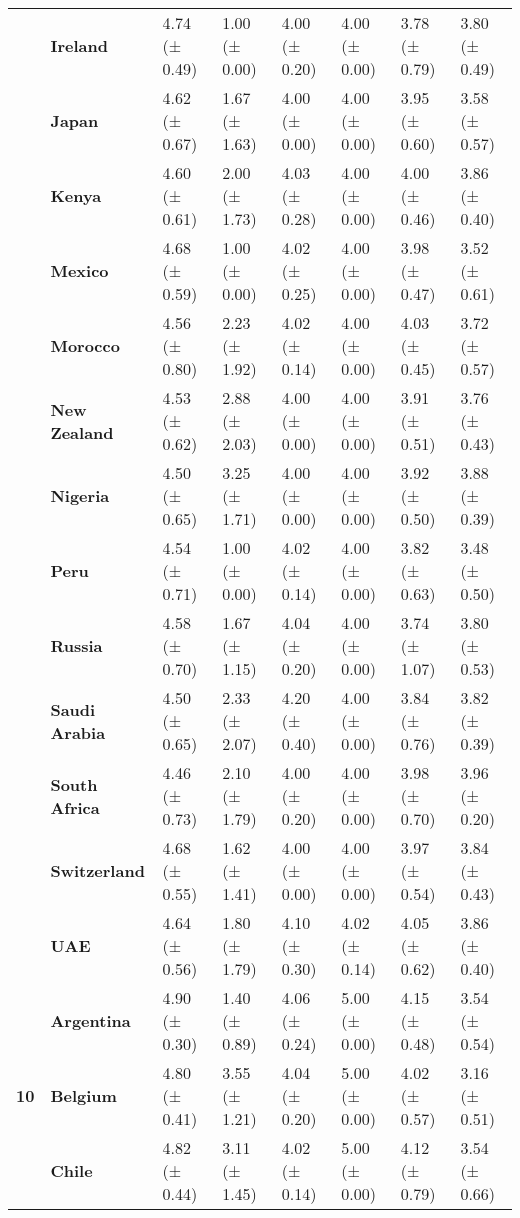 \begin{tabular}{llllllll}
\textbf{} & \textbf{Ireland} & 4.74 (± 0.49) & 1.00 (± 0.00) & 4.00 (± 0.20) & 4.00 (± 0.00) & 3.78 (± 0.79) & 3.80 (± 0.49) \\
\textbf{} & \textbf{Japan} & 4.62 (± 0.67) & 1.67 (± 1.63) & 4.00 (± 0.00) & 4.00 (± 0.00) & 3.95 (± 0.60) & 3.58 (± 0.57) \\
\textbf{} & \textbf{Kenya} & 4.60 (± 0.61) & 2.00 (± 1.73) & 4.03 (± 0.28) & 4.00 (± 0.00) & 4.00 (± 0.46) & 3.86 (± 0.40) \\
\textbf{} & \textbf{Mexico} & 4.68 (± 0.59) & 1.00 (± 0.00) & 4.02 (± 0.25) & 4.00 (± 0.00) & 3.98 (± 0.47) & 3.52 (± 0.61) \\
\textbf{} & \textbf{Morocco} & 4.56 (± 0.80) & 2.23 (± 1.92) & 4.02 (± 0.14) & 4.00 (± 0.00) & 4.03 (± 0.45) & 3.72 (± 0.57) \\
\textbf{} & \textbf{New Zealand} & 4.53 (± 0.62) & 2.88 (± 2.03) & 4.00 (± 0.00) & 4.00 (± 0.00) & 3.91 (± 0.51) & 3.76 (± 0.43) \\
\textbf{} & \textbf{Nigeria} & 4.50 (± 0.65) & 3.25 (± 1.71) & 4.00 (± 0.00) & 4.00 (± 0.00) & 3.92 (± 0.50) & 3.88 (± 0.39) \\
\textbf{} & \textbf{Peru} & 4.54 (± 0.71) & 1.00 (± 0.00) & 4.02 (± 0.14) & 4.00 (± 0.00) & 3.82 (± 0.63) & 3.48 (± 0.50) \\
\textbf{} & \textbf{Russia} & 4.58 (± 0.70) & 1.67 (± 1.15) & 4.04 (± 0.20) & 4.00 (± 0.00) & 3.74 (± 1.07) & 3.80 (± 0.53) \\
\textbf{} & \textbf{Saudi Arabia} & 4.50 (± 0.65) & 2.33 (± 2.07) & 4.20 (± 0.40) & 4.00 (± 0.00) & 3.84 (± 0.76) & 3.82 (± 0.39) \\
\textbf{} & \textbf{South Africa} & 4.46 (± 0.73) & 2.10 (± 1.79) & 4.00 (± 0.20) & 4.00 (± 0.00) & 3.98 (± 0.70) & 3.96 (± 0.20) \\
\textbf{} & \textbf{Switzerland} & 4.68 (± 0.55) & 1.62 (± 1.41) & 4.00 (± 0.00) & 4.00 (± 0.00) & 3.97 (± 0.54) & 3.84 (± 0.43) \\
\textbf{} & \textbf{UAE} & 4.64 (± 0.56) & 1.80 (± 1.79) & 4.10 (± 0.30) & 4.02 (± 0.14) & 4.05 (± 0.62) & 3.86 (± 0.40) \\
\cline{1-8}
\multirow[t]{19}{*}{\textbf{10}} & \textbf{Argentina} & 4.90 (± 0.30) & 1.40 (± 0.89) & 4.06 (± 0.24) & 5.00 (± 0.00) & 4.15 (± 0.48) & 3.54 (± 0.54) \\
\textbf{} & \textbf{Belgium} & 4.80 (± 0.41) & 3.55 (± 1.21) & 4.04 (± 0.20) & 5.00 (± 0.00) & 4.02 (± 0.57) & 3.16 (± 0.51) \\
\textbf{} & \textbf{Chile} & 4.82 (± 0.44) & 3.11 (± 1.45) & 4.02 (± 0.14) & 5.00 (± 0.00) & 4.12 (± 0.79) & 3.54 (± 0.66) \\

\end{tabular}
